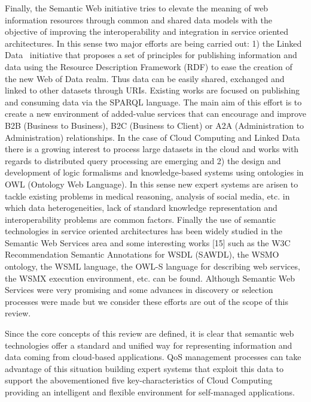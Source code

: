 Finally, the Semantic Web initiative tries to elevate the meaning of web information resources through common and shared data models 
with the objective of improving the interoperability and integration in service oriented architectures.  In this sense two major efforts are being carried out: 1) the Linked Data~\cite{Berners-Lee-2006,Heath_Bizer_2011} 
initiative that proposes a set of principles for publishing information and data using the Resource Description Framework (RDF) to ease the creation of 
the new Web of Data realm. Thus data can be easily shared, exchanged and linked to other datasets through URIs. Existing works are focused on publishing and 
consuming data via the SPARQL language. The main aim of this effort is to create a new environment of added-value services that can encourage and improve B2B (Business to Business), 
B2C (Business to Client) or A2A (Administration to Administration) relationships. In the case of Cloud Computing and Linked Data there is a growing interest to process large datasets in the 
cloud and works with regards to distributed query processing are emerging and 2) the design and development of logic formalisms and knowledge-based systems using ontologies 
in OWL (Ontology Web Language). In this sense new expert systems are arisen to tackle existing problems in medical reasoning, analysis of social media, etc. in which data heterogeneities, 
lack of standard knowledge representation and interoperability problems are common factors. Finally the use of semantic technologies in service oriented architectures has been widely 
studied in the Semantic Web Services area and some interesting works [15] such as the W3C Recommendation Semantic Annotations for WSDL (SAWDL), the WSMO ontology, the WSML language, 
the OWL-S language for describing web services, the WSMX execution environment, etc. can be found. Although Semantic Web Services were very promising and some advances 
in discovery or selection processes were made but we consider these efforts are out of the scope of this review.

Since the core concepts of this review are defined, it is clear that semantic web technologies offer a standard and unified way for representing information and data coming from cloud-based applications. 
QoS management processes can take advantage of this situation building expert systems that exploit this data to support the abovementioned five key-characteristics of 
Cloud Computing providing an intelligent and flexible environment for self-managed applications.
